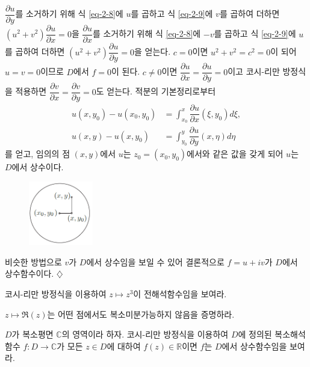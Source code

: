 \begin{salt_example}
$\dfrac{\partial u}{\partial y}$를 소거하기 위해 식 \eqref{eq-2-8}에 $u$를 곱하고
식 \eqref{eq-2-9}에 $v$를 곱하여 더하면
$(u^2+v^2)\dfrac{\partial u}{\partial x}  = 0$을
$\dfrac{\partial u}{\partial x}$를 소거하기 위해 식 \eqref{eq-2-8}에 $-v$를 곱하고
식 \eqref{eq-2-9}에 $u$를 곱하여 더하면
$(u^2+v^2)\dfrac{\partial u}{\partial y}  = 0$을 얻는다.
$c=0$이면  $u^2+v^2=c^2=0$이 되어 $u=v=0$이므로 $D$에서 $f=0$이 된다.
$c\ne0$이면 $\dfrac{\partial u}{\partial x}= \dfrac{\partial u}{\partial y}=0$이고
코시-리만 방정식을 적용하면 
$\dfrac{\partial v}{\partial x}= \dfrac{\partial v}{\partial y}=0$도 얻는다.
적분의 기본정리로부터 
\begin{align*}
u(x,y_0) - u(x_0, y_0) &= \int_{x_0}^x \dfrac{\partial u}{\partial x}(\xi, y_0)d\xi, \\
u(x,y) - u(x, y_0) &= \int_{y_0}^y \dfrac{\partial u}{\partial y}(x, \eta)d\eta
\end{align*}
를 얻고, 임의의 점 $(x,y)$에서 $u$는 $z_0 = (x_0,y_0)$에서와 같은 값을 갖게 되어
 $u$는 $D$에서 상수이다.

\begin{figure}[!h]
\begin{center}
\includegraphics[width=0.25\textwidth]{./SaltChapter/fig-2-0-3}
\end{center}
\end{figure}

비슷한 방법으로 $v$가 $D$에서 상수임을 보일 수 있어
결론적으로 $f=u+iv$가 $D$에서 상수함수이다.
\hfill $\diamondsuit$
\end{salt_example}

\begin{salt_exercise} \label{ex-2-10}
코시-리만 방정식을 이용하여 $z\mapsto z^3$이 전해석함수임을 보여라.
\end{salt_exercise}

\begin{salt_exercise} \label{ex-2-11}
$z\mapsto \Re(z)$는 어떤 점에서도 복소미분가능하지 않음을 증명하라.
\end{salt_exercise}

\begin{salt_exercise} \label{ex-2-12}
$D$가 복소평면 $\mathbb C$의 영역이라 하자.
코시-리만 방정식을 이용하여 
$D$에 정의된 복소해석함수 $f:D\to\mathbb C$가 
모든  $z\in D$에 대하여 $f(z)\in\mathbb R$이면
$f$는 $D$에서 상수함수임을 보여라.
\end{salt_exercise}


